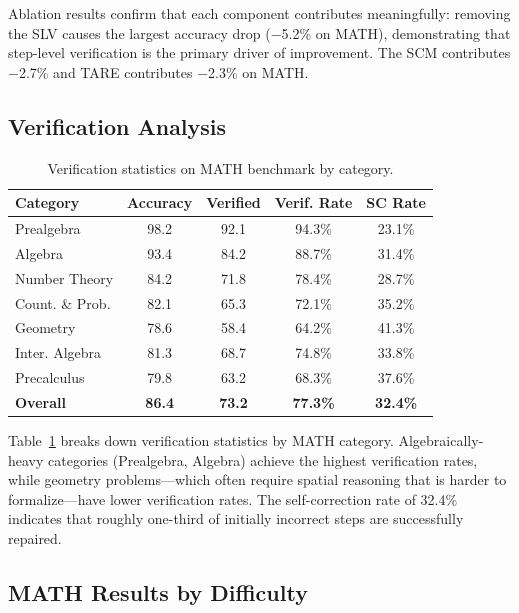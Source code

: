 \documentclass[11pt,a4paper]{article}
\begin{document}
Ablation results confirm that each component contributes meaningfully: removing the SLV causes the largest accuracy drop ($-$5.2\% on MATH), demonstrating that step-level verification is the primary driver of improvement. The SCM contributes $-$2.7\% and TARE contributes $-$2.3\% on MATH.

\subsection{Verification Analysis}

\begin{table}[t]
\centering
\caption{Verification statistics on MATH benchmark by category.}
\label{tab:verification}
\begin{tabular}{lcccc}
\toprule
\textbf{Category} & \textbf{Accuracy} & \textbf{Verified} & \textbf{Verif. Rate} & \textbf{SC Rate} \\
\midrule
Prealgebra & 98.2 & 92.1 & 94.3\% & 23.1\% \\
Algebra & 93.4 & 84.2 & 88.7\% & 31.4\% \\
Number Theory & 84.2 & 71.8 & 78.4\% & 28.7\% \\
Count. \& Prob. & 82.1 & 65.3 & 72.1\% & 35.2\% \\
Geometry & 78.6 & 58.4 & 64.2\% & 41.3\% \\
Inter. Algebra & 81.3 & 68.7 & 74.8\% & 33.8\% \\
Precalculus & 79.8 & 63.2 & 68.3\% & 37.6\% \\
\midrule
\textbf{Overall} & \textbf{86.4} & \textbf{73.2} & \textbf{77.3\%} & \textbf{32.4\%} \\
\bottomrule
\end{tabular}
\end{table}

Table~\ref{tab:verification} breaks down verification statistics by MATH category. Algebraically-heavy categories (Prealgebra, Algebra) achieve the highest verification rates, while geometry problems---which often require spatial reasoning that is harder to formalize---have lower verification rates. The self-correction rate of 32.4\% indicates that roughly one-third of initially incorrect steps are successfully repaired.

\subsection{MATH Results by Difficulty}
\end{document}
